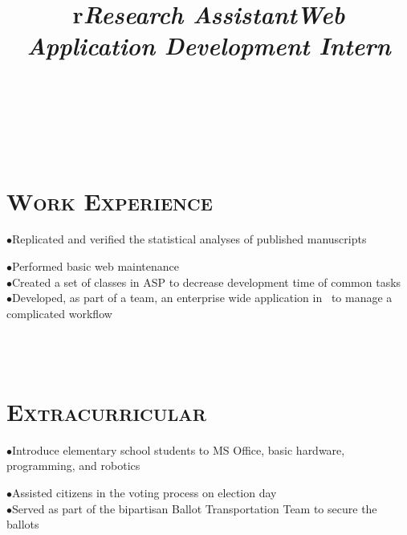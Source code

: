 \begin{resume}
\begin{formatb}
  \title{r}\\
  \\
  \body\\
\end{formatb}

\section{\textsc{Work Experience}}

\title{\textit{Research Assistant}}
\begin{position}
$\bullet$Replicated and verified the statistical analyses of published manuscripts
\end{position}


\title{\textit{Web Application Development Intern}}
\begin{position}
$\bullet$Performed basic web maintenance \\
$\bullet$Created a set of classes in ASP to decrease development time of common tasks \\
$\bullet$Developed, as part of a team, an enterprise wide application in \CSharp \ to manage a complicated workflow 
\end{position}


\begin{formatb}
  \\
  \body\\
\end{formatb}

\section{\textsc{Extracurricular}}
\begin{position}
$\bullet$Introduce elementary school students to MS Office, basic hardware, programming, and robotics
\end{position}

\begin{position}
$\bullet$Assisted citizens in the voting process on election day \\
$\bullet$Served as part of the bipartisan Ballot Transportation Team to secure the ballots
\end{position}



\end{resume}


